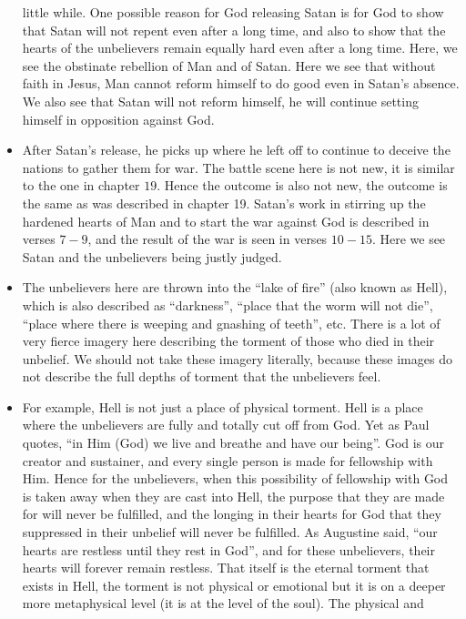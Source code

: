 \begin{itemize}
{  little while.  One possible reason for God releasing Satan is for God to
  show that Satan will not repent even after a long time, and also to show
  that the hearts of the unbelievers remain equally hard even after a long
  time.  Here, we see the obstinate rebellion of Man and of Satan.  Here we
  see that without faith in Jesus, Man cannot reform himself to do good even
  in Satan's absence.  We also see that Satan will not reform himself, he
  will continue setting himself in opposition against God.  }
  \item{After Satan's release, he picks up where he left off to continue to
  deceive the nations to gather them for war.  The battle scene here is not
  new, it is similar to the one in chapter $19$.  Hence the outcome is also
  not new, the outcome is the same as was described in chapter 19.  Satan's
  work in stirring up the hardened hearts of Man and to start the war against
  God is described in verses $7-9$, and the result of the war is seen in
  verses $10-15$.  Here we see Satan and the unbelievers being justly judged.}
  \item{The unbelievers here are thrown into the ``lake of fire'' (also known
  as Hell), which is also described as ``darkness'', ``place that the worm
  will not die'', ``place where there is weeping and gnashing of teeth'',
  etc.  There is a lot of very fierce imagery here describing the torment of
  those who died in their unbelief.  We should not take these imagery
  literally, because these images do not describe the full depths of torment
  that the unbelievers feel.}
  \item{For example, Hell is not just a place of physical torment.  Hell is a
  place where the unbelievers are fully and totally cut off from God.  Yet as
  Paul quotes, ``in Him (God) we live and breathe and have our being''.  God
  is our creator and sustainer, and every single person is made for
  fellowship with Him.  Hence for the unbelievers, when this possibility of
  fellowship with God is taken away when they are cast into Hell, the purpose
  that they are made for will never be fulfilled, and the longing in their
  hearts for God that they suppressed in their unbelief will never be
  fulfilled.  As Augustine said, ``our hearts are restless until they rest in
  God'', and for these unbelievers, their hearts will forever remain
  restless.  That itself is the eternal torment that exists in Hell, the
  torment is not physical or emotional but it is on a deeper more
  metaphysical level (it is at the level of the soul).  The physical and
}
\end{itemize}
